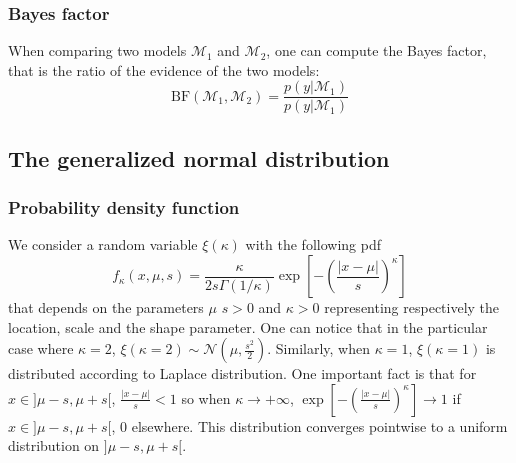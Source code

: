 \documentclass[a4paper,11pt]{article}
\theoremstyle{defi}
\numberwithin{thmCounter}{section}
\begin{document}
\subsubsection{Bayes factor}
When comparing two models $\mathcal{M}_1$ and $\mathcal{M}_2$, one can compute the Bayes factor, that is the ratio of the evidence of the two models:
\begin{equation}
  \label{eq:bayes_factor}
  \mathrm{BF}(\mathcal{M}_1, \mathcal{M}_2) = \frac{p(y | \mathcal{M}_1)}{p(y | \mathcal{M}_1)}
\end{equation}
\subsection{The generalized normal distribution}
\label{sec:generalized_normal_distribution}
\subsubsection{Probability density function}
\label{sec:generalized_normal_distribution_pdf}
We consider a random variable $\xi(\kappa)$ with the following pdf
\begin{equation}
  \label{eq:pdf_GND}
  f_{\kappa}(x, \mu, s) = \frac{\kappa}{2 s \Gamma(1/\kappa)} \exp\left[-\left(\frac{\lvert x-\mu \rvert}{s}\right)^\kappa\right]
\end{equation}
that depends on the parameters $\mu$ $s>0$ and $\kappa>0$ representing respectively the location, scale and the shape parameter.
One can notice that in the particular case where $\kappa=2$, $\xi(\kappa=2)\sim \mathcal{N}(\mu, \frac{s^2}{2})$. Similarly, when $\kappa=1$, $\xi(\kappa=1)$ is distributed according to Laplace distribution.
One important fact is that for $x \in ]\mu - s,\mu +s[$, $\frac{\lvert x-\mu \rvert}{s} < 1$ so when $\kappa \rightarrow +\infty$, $\exp\left[-\left(\frac{\lvert x-\mu \rvert}{s}\right)^\kappa\right] \rightarrow 1$ if $x \in ]\mu - s,\mu +s[$, $0$ elsewhere. This distribution converges pointwise to a uniform distribution on $]\mu - s,\mu +s[$.
\end{document}
